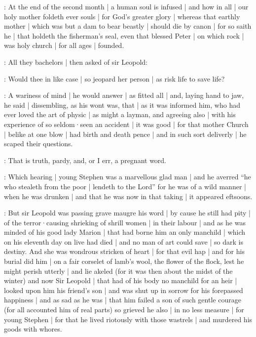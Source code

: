 \stephen:
At the end of the second month |
a human soul is infused |
and how in all |
our holy mother foldeth ever souls |
for God's greater glory |
whereas that earthly mother |
which was but a dam to bear beastly |
should die by canon |
for so saith he |
that holdeth the fisherman's seal,
even that blessed Peter |
on which rock |
was holy church |
for all ages |
founded.

:
All they bachelors |
then asked of sir Leopold:

\All:
Would thee in like case |
so jeopard her person |
as risk life to save life?

:
A wariness of mind |
he would answer |
as fitted all |
and,
laying hand to jaw,
he said |
dissembling,
as his wont was,
that |
as it was informed him,
who had ever loved the art of physic |
as might a layman,
and agreeing also |
with his experience of so seldom·seen an accident |
it was good |
for that mother Church |
belike at one blow |
had birth and death pence |
and in such sort deliverly |
he scaped their questions.

\dixon:
That is truth,
pardy,
and,
or I err,
a pregnant word.

:
Which hearing |
young Stephen was a marvellous glad man |
and he averred
“he who stealeth from the poor |
lendeth to the Lord”
for he was of a wild manner |
when he was drunken |
and that he was now in that taking |
it appeared eftsoons.


:
But sir Leopold was passing grave maugre his word |
by cause he still had pity |
of the terror·causing shrieking of shrill women |
in their labour |
and as he was minded of his good lady Marion |
that had borne him an only manchild |
which on his eleventh day on live had died |
and no man of art could save |
so dark is destiny.
And she was wondrous stricken of heart |
for that evil hap |
and for his burial did him |
on a fair corselet of lamb's wool,
the flower of the flock,
lest he might perish utterly |
and lie akeled
(for it was then about the midst of the winter)
and now Sir Leopold |
that had of his body no manchild for an heir |
looked upon him his friend's son |
and was shut up in sorrow for his forepassed happiness |
and as sad as he was |
that him failed a son of such gentle courage
(for all accounted him of real parts)
so grieved he also |
in no less measure |
for young Stephen |
for that he lived riotously with those wastrels |
and murdered his goods with whores.

